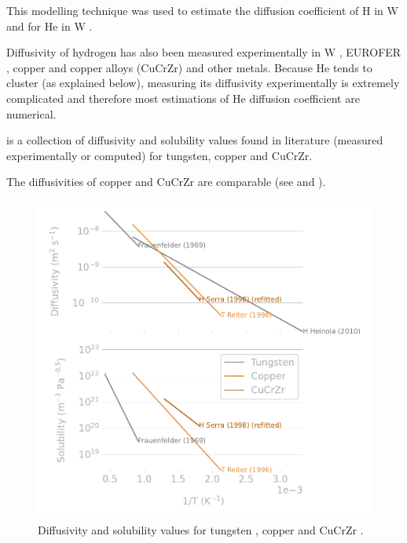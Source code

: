 This modelling technique was used to estimate the diffusion coefficient of H in W  and for He in W .

Diffusivity of hydrogen has also been measured experimentally in W , EUROFER , copper and copper alloys (CuCrZr)  and other metals.
Because He tends to cluster (as explained below), measuring its diffusivity experimentally is extremely complicated and therefore most estimations of He diffusion coefficient are numerical.

 is a collection of diffusivity and solubility values found in literature (measured experimentally or computed) for tungsten, copper and CuCrZr.

The diffusivities of copper and CuCrZr are comparable (see  and ).

\begin{figure}
    \centering
    \includegraphics[width=0.75\linewidth]{Figures/Chapter1/materials_properties_review_comparison.pdf}
    \caption{Diffusivity and solubility values for tungsten \cite{heinola_first-principles_2010, frauenfelder_solution_1969}, copper \cite{reiter_compilation_1996} and CuCrZr \cite{serra_hydrogen_1998}.}
\end{figure}

